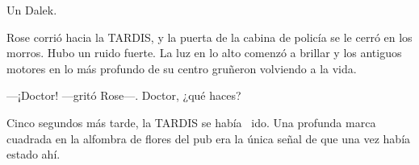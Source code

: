 Un Dalek.

Rose corrió hacia la TARDIS, y la puerta de la cabina de policía se le
cerró en los morros. Hubo un ruido fuerte. La luz en lo alto comenzó a
brillar y los antiguos motores en lo más profundo de su centro gruñeron
volviendo a la vida.

---¡Doctor! ---gritó Rose---. Doctor, ¿qué haces?

Cinco segundos más tarde, la TARDIS se había ~ido. Una profunda marca
cuadrada en la alfombra de flores del pub era la única señal de que una
vez había estado ahí.